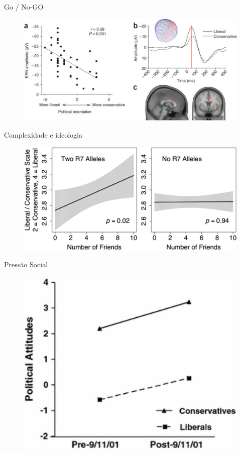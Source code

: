 \documentclass{beamer}
\begin{document}
    \begin{frame}{Go / No-GO}%
    \begin{figure}
        \includegraphics[scale=0.4]{Figures/amodio} 
        \end{figure}
    \end{frame} %

    \begin{frame}{Complexidade e ideologia}%
        \begin{figure}
            \centering
            \includegraphics[scale=0.4]{Figures/DRD4_Fowler}
        \end{figure}
    \end{frame}%

    \begin{frame}{Pressão Social}%
        \begin{figure}
            \centering
            \includegraphics[scale=0.5]{Figures/nail_threat}
        \end{figure}
    \end{frame}%
\end{document}
